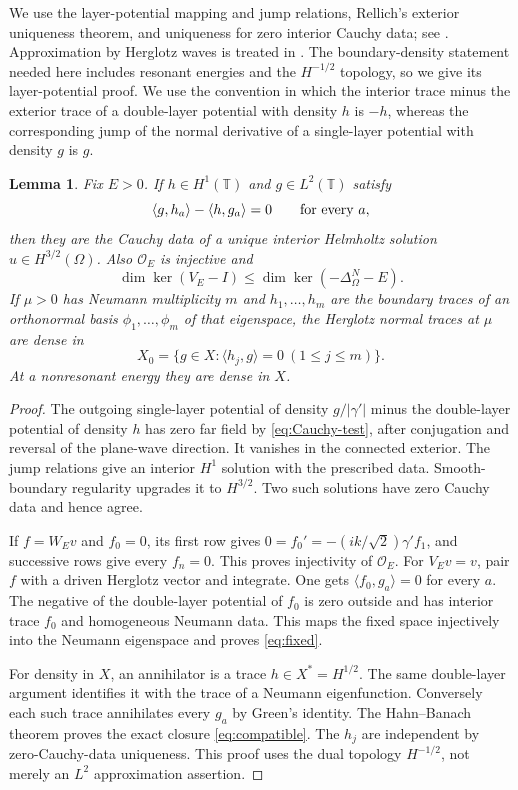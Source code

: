 \documentclass[11pt]{amsart}
\numberwithin{equation}{section}
\newtheorem{lemma}{Lemma}[section]
\newcommand{\T}{\mathbb T}
\newcommand{\OO}{\mathcal O}
\newcommand{\ip}[2]{\langle #1,#2\rangle}
\begin{document}
We use the layer-potential mapping and jump relations, Rellich's
exterior uniqueness theorem, and uniqueness for zero interior Cauchy
data; see \cite{McLean}. Approximation by Herglotz waves is treated
in \cite{CK}. The boundary-density statement needed here includes
resonant energies and the $H^{-1/2}$ topology, so we give its
layer-potential proof. We use the convention in which the interior
trace minus the exterior trace of a double-layer potential with
density $h$ is $-h$, whereas the corresponding jump of the normal
derivative of a single-layer potential with density $g$ is $g$.

\begin{lemma}\label{lem:Cauchy}
Fix $E>0$.
If $h\in H^1(\T)$ and $g\in L^2(\T)$ satisfy
\begin{equation}\label{eq:Cauchy-test}
 \ip g{h_a}-\ip h{g_a}=0\qquad\hbox{for every }a,
\end{equation}
then they are the Cauchy data of a unique interior Helmholtz solution
$u\in H^{3/2}(\Omega)$. Also $\OO_E$ is injective and
\begin{equation}\label{eq:fixed}
 \dim\ker(V_E-I)\le\dim\ker(-\Delta_\Omega^N-E).
\end{equation}
If $\mu>0$ has Neumann multiplicity $m$ and $h_1,\ldots,h_m$ are the
boundary traces of an orthonormal basis $\phi_1,\ldots,\phi_m$ of that eigenspace, the Herglotz
normal traces at $\mu$ are dense in
\begin{equation}\label{eq:compatible}
 X_0=\{g\in X:\ip{h_j}g=0\ (1\le j\le m)\}.
\end{equation}
At a nonresonant energy they are dense in $X$.
\end{lemma}
\begin{proof}
The outgoing single-layer potential of density $g/|\gamma'|$ minus the
double-layer potential of density $h$ has zero far field by
\eqref{eq:Cauchy-test}, after conjugation and reversal of the plane-wave
direction. It vanishes in the connected exterior. The jump relations
give an interior $H^1$ solution with the prescribed data. Smooth-boundary
regularity upgrades it to $H^{3/2}$. Two such solutions have zero Cauchy
data and hence agree.

If $f=W_Ev$ and $f_0=0$, its first row gives
$0=f_0'=-(ik/\sqrt2)\gamma'f_1$, and successive rows give every $f_n=0$.
This proves injectivity of $\OO_E$. For $V_Ev=v$, pair $f$ with a driven
Herglotz vector and integrate. One gets $\ip{f_0}{g_a}=0$ for every $a$.
The negative of the double-layer potential of $f_0$ is zero outside
and has interior trace $f_0$ and homogeneous Neumann data. This
maps the fixed space injectively into the Neumann eigenspace and proves
\eqref{eq:fixed}.

For density in $X$, an annihilator is a trace $h\in X^*=H^{1/2}$.
The same double-layer argument identifies it with the trace of a Neumann
eigenfunction. Conversely each such trace annihilates every $g_a$ by
Green's identity. The Hahn--Banach theorem proves the exact closure
\eqref{eq:compatible}. The $h_j$ are independent by zero-Cauchy-data
uniqueness. This proof uses the dual topology $H^{-1/2}$, not merely an
$L^2$ approximation assertion.
\end{proof}
\end{document}
